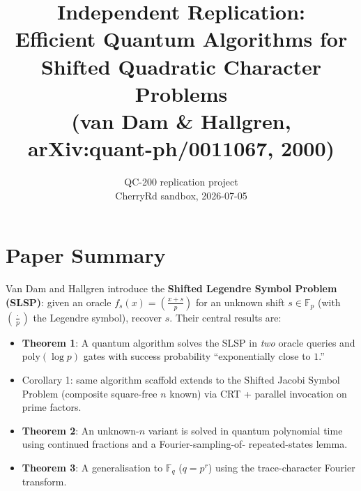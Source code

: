 \documentclass[11pt]{article}
\title{Independent Replication:\\
\textbf{Efficient Quantum Algorithms for Shifted Quadratic Character Problems}\\
(van Dam \& Hallgren, arXiv:quant-ph/0011067, 2000)}
\author{QC-200 replication project\\ CherryRd sandbox, 2026-07-05}
\date{}
\begin{document}
\maketitle

\begin{center}
\end{center}

\section{Paper Summary}

Van Dam and Hallgren introduce the \textbf{Shifted Legendre Symbol Problem
(SLSP)}: given an oracle $f_s(x) = \left(\tfrac{x+s}{p}\right)$ for an
unknown shift $s\in\mathbb{F}_p$ (with $\left(\tfrac{\cdot}{p}\right)$
the Legendre symbol), recover $s$. Their central results are:

\begin{itemize}
  \item \textbf{Theorem 1}: A quantum algorithm solves the SLSP in
    \emph{two} oracle queries and $\text{poly}(\log p)$ gates with
    success probability ``exponentially close to $1$.''
  \item Corollary 1: same algorithm scaffold extends to the Shifted
    Jacobi Symbol Problem (composite square-free $n$ known) via CRT
    + parallel invocation on prime factors.
  \item \textbf{Theorem 2}: An unknown-$n$ variant is solved in quantum
    polynomial time using continued fractions and a Fourier-sampling-of-
    repeated-states lemma.
  \item \textbf{Theorem 3}: A generalisation to $\mathbb{F}_q$
    ($q = p^r$) using the trace-character Fourier transform.
\end{itemize}
\end{document}

